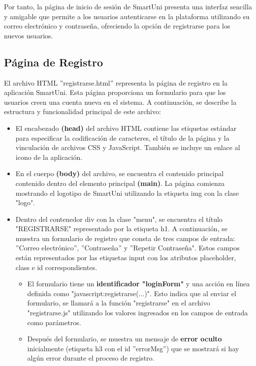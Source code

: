 \documentclass[12pt]{report}
\begin{document}
Por tanto, la página de inicio de sesión de SmartUni presenta una interfaz sencilla y amigable que permite a los usuarios autenticarse en la plataforma utilizando su correo electrónico y contraseña, ofreciendo la opción de registrarse para los nuevos usuarios.

\subsection{Página de Registro}
El archivo HTML ''registrarse.html'' representa la página de registro en la aplicación SmartUni. Esta página proporciona un formulario para que los usuarios creen una cuenta nueva en el sistema. A continuación, se describe la estructura y funcionalidad principal de este archivo:

\begin{itemize}
    \item El encabezado \textbf{(head)} del archivo HTML contiene las etiquetas estándar para especificar la codificación de caracteres, el título de la página y la vinculación de archivos CSS y JavaScript. También se incluye un enlace al icono de la aplicación.

    \item En el cuerpo \textbf{(body)} del archivo, se encuentra el contenido principal contenido dentro del elemento principal \textbf{(main)}. La página comienza mostrando el logotipo de SmartUni utilizando la etiqueta img con la clase "logo".

    \item Dentro del contenedor div con la clase "menu", se encuentra el título "REGISTRARSE" representado por la etiqueta h1. A continuación, se muestra un formulario de registro que consta de tres campos de entrada: ''Correo electrónico'', ''Contraseña'' y ''Repetir Contraseña". Estos campos están representados por las etiquetas input con los atributos placeholder, class e id correspondientes.

    \begin{itemize}
        \item El formulario tiene un \textbf{identificador "loginForm"} y una acción en línea definida como "javascript:registrarse(...)". Esto indica que al enviar el formulario, se llamará a la función "registrarse" en el archivo "registrarse.js" utilizando los valores ingresados en los campos de entrada como parámetros.
        
        \item Después del formulario, se muestra un mensaje de\textbf{ error oculto} inicialmente (etiqueta h3 con el id ''errorMsg'') que se mostrará si hay algún error durante el proceso de registro.
        

\end{itemize}
\end{itemize}
\end{document}
